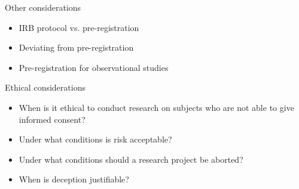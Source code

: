 \documentclass[xcolor={dvipsnames},handout]{beamer}
\begin{document}

\begin{frame}{Other considerations}

\begin{itemize}
\item IRB protocol vs. pre-registration
\item Deviating from pre-registration 
\item Pre-registration for observational studies
\end{itemize}

\end{frame}




\begin{frame}{Ethical considerations}

\begin{itemize}
\item When is it ethical to conduct research on subjects who are not able to give informed consent?
\item Under what conditions is risk acceptable?
\item Under what conditions should a research project be aborted?
\item When is deception justifiable?
\end{itemize}

\end{frame}


\end{document}
